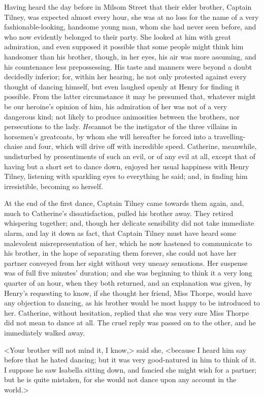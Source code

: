 Having heard the day before in Milsom Street that their elder brother, Captain Tilney, was expected almost every hour, she was at no loss for the name of a very fashionable-looking, handsome young man, whom she had never seen before, and who now evidently belonged to their party. She looked at him with great admiration, and even supposed it possible that some people might think him handsomer than his brother, though, in her eyes, his air was more assuming, and his countenance less prepossessing. His taste and manners were beyond a doubt decidedly inferior; for, within her hearing, he not only protested against every thought of dancing himself, but even laughed openly at Henry for finding it possible. From the latter circumstance it may be presumed that, whatever might be our heroine's opinion of him, his admiration of her was not of a very dangerous kind; not likely to produce animosities between the brothers, nor persecutions to the lady. \textit{He}cannot be the instigator of the three villains in horsemen's greatcoats, by whom she will hereafter be forced into a travelling-chaise and four, which will drive off with incredible speed. Catherine, meanwhile, undisturbed by presentiments of such an evil, or of any evil at all, except that of having but a short set to dance down, enjoyed her usual happiness with Henry Tilney, listening with sparkling eyes to everything he said; and, in finding him irresistible, becoming so herself. 

 At the end of the first dance, Captain Tilney came towards them again, and, much to Catherine's dissatisfaction, pulled his brother away. They retired whispering together; and, though her delicate sensibility did not take immediate alarm, and lay it down as fact, that Captain Tilney must have heard some malevolent misrepresentation of her, which he now hastened to communicate to his brother, in the hope of separating them forever, she could not have her partner conveyed from her sight without very uneasy sensations. Her suspense was of full five minutes' duration; and she was beginning to think it a very long quarter of an hour, when they both returned, and an explanation was given, by Henry's requesting to know, if she thought her friend, Miss Thorpe, would have any objection to dancing, as his brother would be most happy to be introduced to her. Catherine, without hesitation, replied that she was very sure Miss Thorpe did not mean to dance at all. The cruel reply was passed on to the other, and he immediately walked away. 

 <Your brother will not mind it, I know,> said she, <because I heard him say before that he hated dancing; but it was very good-natured in him to think of it. I suppose he saw Isabella sitting down, and fancied she might wish for a partner; but he is quite mistaken, for she would not dance upon any account in the world.> 

